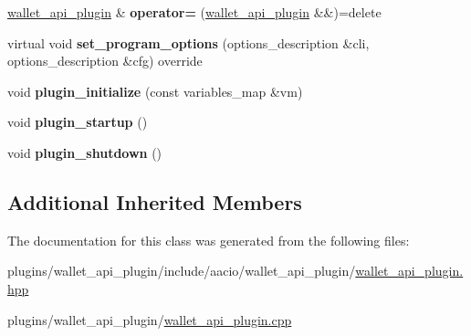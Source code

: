 \begin{DoxyCompactItemize}
\mbox{\hyperlink{classaacio_1_1wallet__api__plugin}{wallet\+\_\+api\+\_\+plugin}} \& {\bfseries operator=} (\mbox{\hyperlink{classaacio_1_1wallet__api__plugin}{wallet\+\_\+api\+\_\+plugin}} \&\&)=delete
\item 
\mbox{\label{classaacio_1_1wallet__api__plugin_a5bbe8b751eeaca97d50a83ee76af686e}} 
virtual void {\bfseries set\+\_\+program\+\_\+options} (options\+\_\+description \&cli, options\+\_\+description \&cfg) override
\item 
\mbox{\label{classaacio_1_1wallet__api__plugin_aed86216bc2042a3415a04675e8cfb6a7}} 
void {\bfseries plugin\+\_\+initialize} (const variables\+\_\+map \&vm)
\item 
\mbox{\label{classaacio_1_1wallet__api__plugin_a6c7ccd1408c9161a5381f76060d0816c}} 
void {\bfseries plugin\+\_\+startup} ()
\item 
\mbox{\label{classaacio_1_1wallet__api__plugin_a386eef3dee41253a564cb050973a9cbf}} 
void {\bfseries plugin\+\_\+shutdown} ()
\end{DoxyCompactItemize}
\subsection*{Additional Inherited Members}


The documentation for this class was generated from the following files\+:\begin{DoxyCompactItemize}
\item 
plugins/wallet\+\_\+api\+\_\+plugin/include/aacio/wallet\+\_\+api\+\_\+plugin/\mbox{\hyperlink{wallet__api__plugin_8hpp}{wallet\+\_\+api\+\_\+plugin.\+hpp}}\item 
plugins/wallet\+\_\+api\+\_\+plugin/\mbox{\hyperlink{wallet__api__plugin_8cpp}{wallet\+\_\+api\+\_\+plugin.\+cpp}}\end{DoxyCompactItemize}
